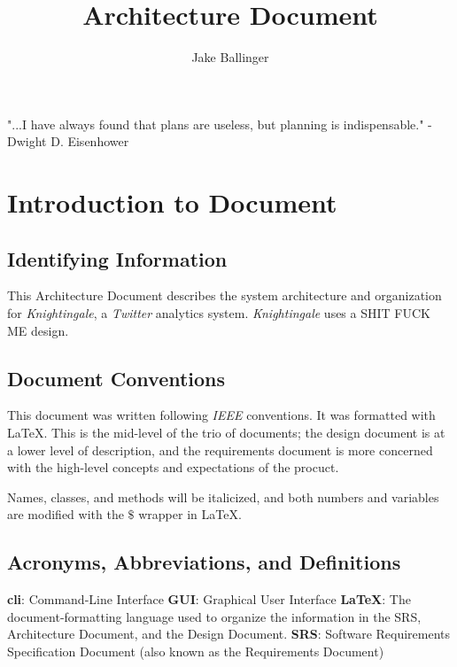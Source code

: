 \documentclass[a4paper, 12pt]{article}
\title{Architecture Document}
\author{Jake Ballinger}
\begin{document}
\maketitle

\begin{center}
\centering  "...I have always found that plans are useless, but planning is indispensable." \newline
\centering - Dwight D. Eisenhower
\end{center}

\section{Introduction to Document} \label{sec:intro}
\subsection{Identifying Information} \label{sec:identify}
\begin{adjustwidth}{2em}{0pt}
This Architecture Document describes the system architecture and organization for \textit{Knightingale}, a \textit{Twitter} analytics system. \textit{Knightingale} uses a SHIT FUCK ME design.
\end{adjustwidth}

\subsection{Document Conventions} \label{sec:conventions}
\begin{adjustwidth}{2em}{0pt}
This document was written following \textit{IEEE} conventions. It was formatted with \LaTeX. This is the mid-level of the trio of documents; the design document is at a lower level of description, and the requirements document is more concerned with the high-level concepts and expectations of the procuct. \newline

\noindent Names, classes, and methods will be italicized, and both numbers and variables are modified with the $\$$ wrapper in \LaTeX.
\end{adjustwidth}

\subsection{Acronyms, Abbreviations, and Definitions} \label{sec:abbr}
\begin{adjustwidth}{2em}{0pt}
\textbf{cli}: Command-Line Interface \newline
\noindent \textbf{GUI}: Graphical User Interface \newline
\noindent \textbf{\LaTeX}: The document-formatting language used to organize the information in the SRS, Architecture Document, and the Design Document. \newline
\noindent \textbf{SRS}: Software Requirements Specification Document (also known as the Requirements Document)
\end{adjustwidth}
\end{document}

